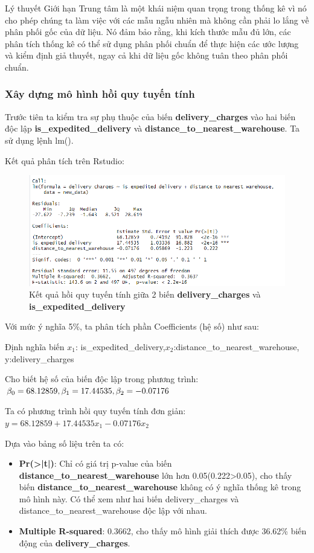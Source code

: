 Lý thuyết Giới hạn Trung tâm là một khái niệm quan trọng trong thống kê vì nó cho phép chúng ta làm việc với các mẫu ngẫu nhiên mà không cần phải lo lắng về phân phối gốc của dữ liệu. Nó đảm bảo rằng, khi kích thước mẫu đủ lớn, các phân tích thống kê có thể sử dụng phân phối chuẩn để thực hiện các ước lượng và kiểm định giả thuyết, ngay cả khi dữ liệu gốc không tuân theo phân phối chuẩn.
\subsubsection{Xây dựng mô hình hồi quy tuyến tính}
Trước tiên ta kiểm tra sự phụ thuộc của biến \textbf{delivery\_charges} vào hai biến độc lập \textbf{is\_expedited\_delivery} và \textbf{distance\_to\_nearest\_warehouse}. Ta sử dụng lệnh lm().

Kết quả phân tích trên Rstudio:
\begin{figure}[H]
  \centering
  \includegraphics[width=0.7\linewidth]{graphics/5.5.1.png}
  \caption{Kết quả hồi quy tuyến tính giữa 2 biến \textbf{delivery\_charges} và \textbf{is\_expedited\_delivery}  }
\end{figure}


Với mức ý nghĩa 5\%, ta phân tích phần Coefficients (hệ số) như sau:

Định nghĩa biến $x_1$: is\_expedited\_delivery,$x_2$:distance\_to\_nearest\_warehouse, y:delivery\_charges

Cho biết hệ số của biến độc lập trong phương trình: $\beta_0= 68.12859, \beta_1= 17.44535,\\ \beta_2= -0.07176 $
 
Ta có phương trình hồi quy tuyến tính đơn giản: $y= 68.12859 + 17.44535x_1 - 0.07176x_2$

 Dựa vào bảng số liệu trên ta có:\\
 \begin{itemize}
 \item\textbf{Pr(>|t|)}: Chỉ có giá trị p-value của biến \textbf{distance\_to\_nearest\_warehouse} lớn hơn 0.05(0.222>0.05), cho thấy biến \textbf{distance\_to\_nearest\_warehouse} không có ý nghĩa thống kê trong mô hình này. Có thể xem như hai biến delivery\_charges và distance\_to\_nearest\_warehouse độc lập với nhau.
\item\textbf{Multiple R-squared}: 0.3662, cho thấy mô hình giải thích được 36.62\% biến động của \textbf{delivery\_charges}.
 \end{itemize}

